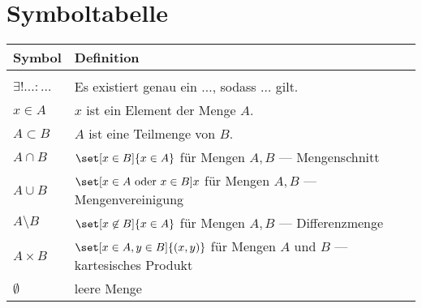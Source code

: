 \documentclass[crop=false,9pt]{standalone}
\begin{document}
	\section*{Symboltabelle}
	\renewcommand{\arraystretch}{1.3}
	\begin{table}[H]
		\begin{tabularx}{\textwidth}{p{}p{}}
			\hline
			\textbf{Symbol} & \textbf{Definition} \\
			\hline
			\hline \\

			$\exists!\ldots :\ldots$ & Es existiert genau ein $\ldots$, sodass $\ldots$ gilt. \\

			$x\in A$ & $x$ ist ein Element der Menge $A$. \\

			$A\subset B$ & $A$ ist eine Teilmenge von $B$. \\

			$A\cap B$ & $\set[x\in B]{x\in A}$ für Mengen $A,B$ --- Mengenschnitt \\

			$A\cup B$ & $\set[x\in A \text{ oder } x\in B]{x}$ für Mengen $A,B$ --- Mengenvereinigung \\

			$A\setminus B$ & $\set[x\not\in B]{x\in A}$ für Mengen $A,B$ --- Differenzmenge \\

			$A\times B$ & $\set[x\in A,y\in B]{(x,y)}$ für Mengen $A$ und $B$ --- kartesisches Produkt \\

			$\emptyset$ & leere Menge \\

		\end{tabularx}
	\end{table}
\end{document}
